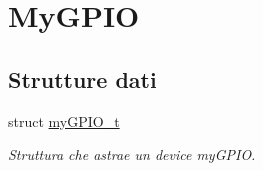 \hypertarget{group__my_g_p_i_o}{\section{My\+G\+P\+I\+O}
\label{group__my_g_p_i_o}
}
\subsection*{Strutture dati}
\begin{DoxyCompactItemize}
\item 
struct \hyperlink{structmy_g_p_i_o__t}{my\+G\+P\+I\+O\+\_\+t}
\begin{DoxyCompactList}\small\item\em Struttura che astrae un device my\+G\+P\+I\+O. \end{DoxyCompactList}\end{DoxyCompactItemize}
